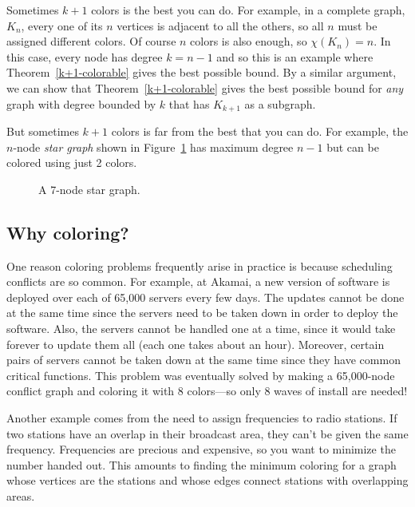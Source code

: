 Sometimes $k+1$ colors is the best you can do.  For example, in a
complete graph, $K_n$, every one of its $n$ vertices is adjacent to
all the others, so all $n$ must be assigned different colors.  Of
course $n$ colors is also enough, so $\chi(K_n)=n$.  In this case,
every node has degree $k = n - 1$ and so this is an example where
Theorem~\ref{k+1-colorable} gives the best possible bound.  By a
similar argument, we can show that Theorem~\ref{k+1-colorable} gives
the best possible bound for \emph{any} graph with degree bounded by
$k$ that has $K_{k+1}$ as a subgraph.

But sometimes $k+1$ colors is far from the best that you can do.
For example, the $n$-node \emph{star graph} shown in
Figure~\ref{fig:5T} has maximum degree $n - 1$ but can be colored
using just 2 colors.

\begin{figure}


\caption{A 7-node star graph.}

\label{fig:5T}

\end{figure}


\subsection{Why coloring?}

One reason coloring problems frequently arise in practice is because
scheduling conflicts are so common.  For example, at Akamai, a new
version of software is deployed over each of 65,000 servers every few
days.  The updates cannot be done at the same time since the servers
need to be taken down in order to deploy the software.  Also, the
servers cannot be handled one at a time, since it would take forever
to update them all (each one takes about an hour).  Moreover, certain
pairs of servers cannot be taken down at the same time since they have
common critical functions.  This problem was eventually solved by
making a 65,000-node conflict graph and coloring it with 8 colors---so
only 8 waves of install are needed!

Another example comes from the need to assign frequencies to radio
stations.  If two stations have an overlap in their broadcast area, they
can't be given the same frequency.  Frequencies are precious and
expensive, so you want to minimize the number handed out.  This amounts to
finding the minimum coloring for a graph whose vertices are the stations
and whose edges connect stations with overlapping areas.


